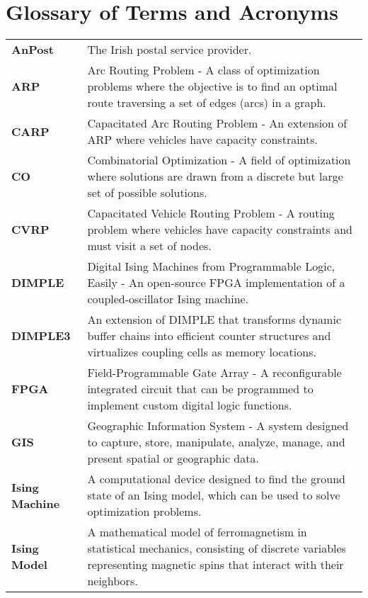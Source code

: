 \section{Glossary of Terms and Acronyms}
\vfill
\begin{tabular}{p{1.5cm}p{14cm}}
\textbf{AnPost} & The Irish postal service provider. \\[0.2cm]

\textbf{ARP} & Arc Routing Problem - A class of optimization problems where the objective is to find an optimal route traversing a set of edges (arcs) in a graph. \\[0.2cm]

\textbf{CARP} & Capacitated Arc Routing Problem - An extension of ARP where vehicles have capacity constraints. \\[0.2cm]

\textbf{CO} & Combinatorial Optimization - A field of optimization where solutions are drawn from a discrete but large set of possible solutions. \\[0.2cm]

\textbf{CVRP} & Capacitated Vehicle Routing Problem - A routing problem where vehicles have capacity constraints and must visit a set of nodes. \\[0.2cm]

\textbf{DIMPLE} & Digital Ising Machines from Programmable Logic, Easily - An open-source FPGA implementation of a coupled-oscillator Ising machine. \\[0.2cm]

\textbf{DIMPLE3} & An extension of DIMPLE that transforms dynamic buffer chains into efficient counter structures and virtualizes coupling cells as memory locations. \\[0.2cm]

\textbf{FPGA} & Field-Programmable Gate Array - A reconfigurable integrated circuit that can be programmed to implement custom digital logic functions. \\[0.2cm]

\textbf{GIS} & Geographic Information System - A system designed to capture, store, manipulate, analyze, manage, and present spatial or geographic data. \\[0.2cm]

\textbf{Ising Machine} & A computational device designed to find the ground state of an Ising model, which can be used to solve optimization problems. \\[0.2cm]

\textbf{Ising Model} & A mathematical model of ferromagnetism in statistical mechanics, consisting of discrete variables representing magnetic spins that interact with their neighbors. \\[0.2cm]


\end{tabular}
